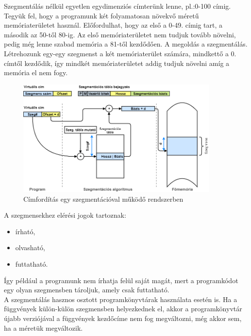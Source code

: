 \documentclass[tikz,12pt,margin=0px]{article}
\begin{document}
    \noindent Szegmentálás nélkül egyetlen egydimenziós címterünk lenne, pl.:0-100 címig. Tegyük fel, hogy a programunk két folyamatosan növekvő méretű memóriaterületet használ. Előfordulhat, hogy az első a 0-49. címig tart, a második az 50-től 80-ig. Az első memóriaterületet nem tudjuk tovább növelni, pedig még lenne szabad memória a 81-től kezdődően. A megoldás a szegmentálás. Létrehozunk egy-egy szegmenst a két memóriaterület számára, mindkettő a 0. címtől kezdődik, így mindkét memóriaterületet addig tudjuk növelni amíg a memória el nem fogy.\\

    \begin{figure}[H]
        \centering
        \includegraphics[width=0.9\textwidth]{img/segmentation_address_conversion.png}
        \caption{Címfordítás egy szegmentációval működő rendszerben}
        \label{segmentation_address_transformation}
    \end{figure}

    \noindent A szegmensekhez elérési jogok tartoznak:
    \begin{itemize}[topsep=8pt,itemsep=4pt,partopsep=4pt, parsep=4pt]
        \item írható,
        \item olvasható,
        \item futtatható.
    \end{itemize}

    \noindent Így például a programunk nem írhatja felül saját magát, mert a programkódot egy olyan szegmensben tároljuk, amely csak futtatható.\\

    \noindent A szegmentálás hasznos osztott programkönyvtárak használata esetén is. Ha a függvények külön-külön szegmensben helyezkednek el, akkor a programkönyvtár újabb verziójával a függvények kezdőcíme nem fog megváltozni, még akkor sem, ha a méretük megváltozik.\\
\end{document}
